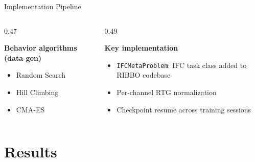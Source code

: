 \documentclass[10pt,aspectratio=169]{beamer}
\newenvironment{tightitemize}{%
    \begin{itemize}
        \setlength{\itemsep}{1pt}
        \setlength{\parskip}{0pt}
        \setlength{\parsep}{0pt}
}{%
    \end{itemize}
}
\begin{document}
\begin{frame}{Implementation Pipeline}
    \vspace{0.55em}
    \begin{columns}[T,onlytextwidth]
        \begin{column}{0.47\textwidth}
            \raggedright
            \textbf{Behavior algorithms (data gen)}
            \begin{tightitemize}
                \item Random Search
                \item Hill Climbing
                \item CMA-ES
            \end{tightitemize}
        \end{column}
        \begin{column}{0.49\textwidth}
            \raggedright
            \textbf{Key implementation}
            \begin{tightitemize}
                \item \texttt{IFCMetaProblem}: IFC task class added to RIBBO codebase
                \item Per-channel RTG normalization
                \item Checkpoint resume across training sessions
            \end{tightitemize}
        \end{column}
    \end{columns}
\end{frame}

\section{Results}
\end{document}
